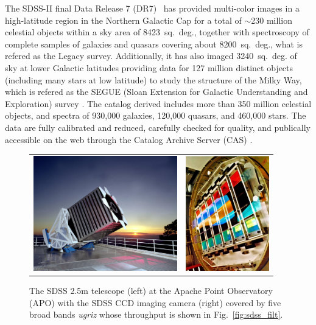 The SDSS-II final Data Release 7 (DR7)~\citep{Abazajian2009} has provided multi-color images in a high-latitude region in the Northern Galactic Cap for a total of $\sim$230 million celestial objects within a sky area of 8423~sq.~deg., together with spectroscopy of complete samples of galaxies and quasars covering about 8200~sq.~deg., what is refered as the Legacy survey. Additionally, it has also imaged 3240~sq.~deg. of sky at lower Galactic latitudes providing data for 127 million distinct objects (including many stars at low latitude) to study the structure of the Milky Way, which is refered as the SEGUE (Sloan Extension for Galactic Understanding and Exploration) survey \citep{Yanny2009}. The catalog derived includes more than 350 million celestial objects, and spectra of 930,000 galaxies, 120,000 quasars, and 460,000 stars. The data are fully calibrated and reduced, carefully checked for quality, and publically accessible on the web through the Catalog Archive Server (CAS) \citep{Thakar2008}. 
\begin{figure}
\centering
\begin{tabular}{rl}
\includegraphics[height=50mm]{./plots/sdss_telescope.jpg} & \includegraphics[height=50mm]{./plots/sdss_camera.jpg}
\end{tabular}
\caption{The SDSS 2.5m telescope (left) at the Apache Point Observatory (APO) with the SDSS CCD imaging camera (right) covered by five broad bands \textit{ugriz} whose throughput is shown in Fig.~\ref{fig:sdss_filt}.}
\label{fig:sdss_survey}
\end{figure}

